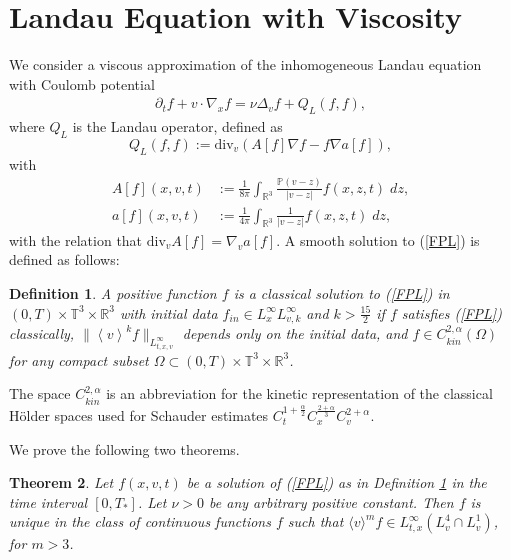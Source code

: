 \documentclass[11pt,american, reqno]{amsart}
\numberwithin{equation}{section}
\newtheorem{theorem}{Theorem}[section]
\newtheorem{definition}[theorem]{Definition}
\newcommand{\R}{\mathbb R}
\newcommand{\1}{\mathds{1}}
\newcommand{\vint}[1]{\left\langle#1\right\rangle}
\newcommand{\T}{\mathbb{T}}
\numberwithin{equation}{section}
\begin{document}

\section{Landau Equation with Viscosity}

We consider a viscous approximation of the inhomogeneous Landau equation with Coulomb potential 
\begin{align}\label{FPL}
\partial_t f + v \cdot \nabla_x f = \nu \Delta_v f  + Q_L ( f,f),  
\end{align}
where $Q_L$ is the Landau operator, defined as 
$$
Q_L ( f,f) :=   \textrm{div}_v \left( A[f] \nabla f - f \nabla a[f]\right),
$$
with 
\begin{align*}
A[f] (x,v,t)& := \frac{1}{8\pi} \int_{\mathbb{R}^3} \frac{\mathbb{P}(v-z) }{|v-z|} f(x,z,t)\;dz,\\
a[f] (x,v,t) &:= \frac{1}{4\pi} \int_{\mathbb{R}^3} \frac{1 }{|v-z|} f(x,z,t)\;dz,
\end{align*}
with the relation that $\textrm{div}_v A[f] = \nabla_v a[f]$.  A smooth solution to (\ref{FPL}) is defined as follows: %

\begin{definition} \label{D_existence}
A positive function $f$ is a classical solution to (\ref{FPL}) in $(0,T) \times \T^3 \times \R^{3}$ with initial data $f_{in} \in L^{\infty}_x L^\infty_{v,k}$ and $k>\frac{15}{2}$ if $f$ satisfies (\ref{FPL}) classically, $ \|\vint{v}^k f\|_{L^\infty_{t,x,v}}$ depends only on the initial data, and $ f \in C_{kin}^{2,\alpha}(\Omega)$ for any compact subset $\Omega \subset (0, T) \times \T^3 \times \mathbb{R}^{3}$.  
\end{definition} 
The space $C_{kin}^{2,\alpha}$ is an abbreviation for the kinetic representation of the classical H\"older spaces used for Schauder estimates $C_t^{1+\frac{\alpha}{2}}C_x^{\frac{2+\alpha}{3}}C_v^{2+\alpha}$. 


We prove the following two theorems.

\begin{theorem} \label{Thm_Landau_0}
Let $f(x,v,t)$ be a solution of (\ref{FPL}) as in Definition \ref{D_existence} in the time interval $[0,T_\ast]$. Let $\nu >0$ be any arbitrary positive constant. Then $f$ is unique in the class of continuous functions $f$ such that  $ \langle v \rangle ^m f \in  L^\infty_{t,x}(L^4_v \cap L^1_v)$, for  $m > 3$. 
\end{theorem}
\end{document}
